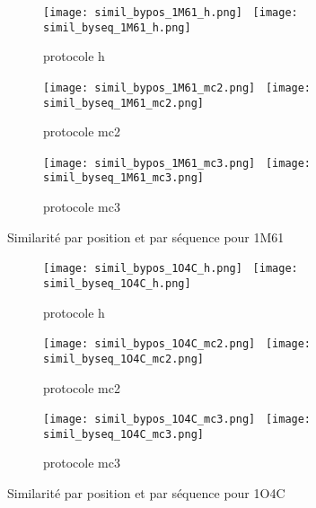    \begin{figure}
   \begin{subfigure}[b]{\linewidth}
     \centering
          \texttt{[image: simil\_bypos\_1M61\_h.png]}~
          \texttt{[image: simil\_byseq\_1M61\_h.png]} 
     \caption{protocole h}
   \end{subfigure}

   \begin{subfigure}[b]{\linewidth}
     \centering
          \texttt{[image: simil\_bypos\_1M61\_mc2.png]}~ 
          \texttt{[image: simil\_byseq\_1M61\_mc2.png]} 
     \caption{protocole mc2}
   \end{subfigure}

   \begin{subfigure}[b]{\linewidth}
     \centering
          \texttt{[image: simil\_bypos\_1M61\_mc3.png]}~  
          \texttt{[image: simil\_byseq\_1M61\_mc3.png]} 
     \caption{protocole mc3}
   \end{subfigure}

     \caption{Similarité par position et par séquence pour 1M61}
\label{grah:simil_1M61}
   \end{figure}

   \begin{figure}
   \begin{subfigure}[b]{\linewidth}
     \centering
          \texttt{[image: simil\_bypos\_1O4C\_h.png]}~
          \texttt{[image: simil\_byseq\_1O4C\_h.png]} 
     \caption{protocole h}
   \end{subfigure}

   \begin{subfigure}[b]{\linewidth}
     \centering
          \texttt{[image: simil\_bypos\_1O4C\_mc2.png]}~ 
          \texttt{[image: simil\_byseq\_1O4C\_mc2.png]} 
     \caption{protocole mc2}
   \end{subfigure}

   \begin{subfigure}[b]{\linewidth}
     \centering
          \texttt{[image: simil\_bypos\_1O4C\_mc3.png]}~  
          \texttt{[image: simil\_byseq\_1O4C\_mc3.png]} 
     \caption{protocole mc3}
   \end{subfigure}

     \caption{Similarité par position et par séquence pour 1O4C}
\label{grah:simil_1O4C}
   \end{figure}

